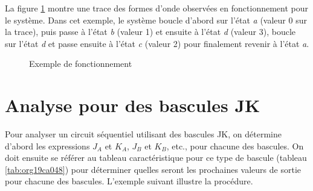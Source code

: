 \documentclass[letter, oneside]{book}
\begin{document}
La figure \ref{fig:org84cc3ce} montre une trace des formes d'onde
observées en fonctionnement pour le système. Dans cet exemple, le
système boucle d'abord sur l'état \emph{a} (valeur 0 sur la trace), puis
passe à l'état \emph{b} (valeur 1) et ensuite à l'état \emph{d} (valeur 3),
boucle sur l'état \emph{d} et passe ensuite à l'état \emph{c} (valeur 2) pour
finalement revenir à l'état \emph{a}.

\begin{figure}[htbp]
\centering

\caption{\label{fig:org84cc3ce}Exemple de fonctionnement}
\end{figure}

\section{Analyse pour des bascules JK}
\label{sec:org5fe1129}

Pour analyser un circuit séquentiel utilisant des bascules JK, on
détermine d'abord les expressions \(J_A\) et \(K_A\), \(J_B\) et
\(K_B\), etc., pour chacune des bascules. On doit ensuite se référer
au tableau caractéristique pour ce type de bascule (tableau
\ref{tab:org19ca048}) pour déterminer quelles seront les prochaines valeurs
de sortie pour chacune des bascules. L'exemple suivant illustre la
procédure.
\end{document}
